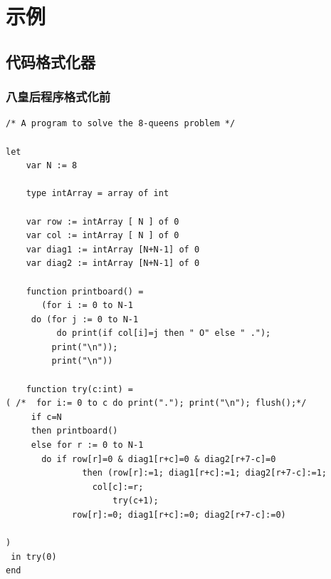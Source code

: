 \section{示例}

\subsection{代码格式化器}

\subsubsection{八皇后程序格式化前}
\begin{verbatim}
/* A program to solve the 8-queens problem */

let
    var N := 8

    type intArray = array of int

    var row := intArray [ N ] of 0
    var col := intArray [ N ] of 0
    var diag1 := intArray [N+N-1] of 0
    var diag2 := intArray [N+N-1] of 0

    function printboard() =
       (for i := 0 to N-1
	 do (for j := 0 to N-1 
	      do print(if col[i]=j then " O" else " .");
	     print("\n"));
         print("\n"))

    function try(c:int) = 
( /*  for i:= 0 to c do print("."); print("\n"); flush();*/
     if c=N
     then printboard()
     else for r := 0 to N-1
	   do if row[r]=0 & diag1[r+c]=0 & diag2[r+7-c]=0
	           then (row[r]:=1; diag1[r+c]:=1; diag2[r+7-c]:=1;
		         col[c]:=r;
	                 try(c+1);
			 row[r]:=0; diag1[r+c]:=0; diag2[r+7-c]:=0)

)
 in try(0)
end
\end{verbatim}

